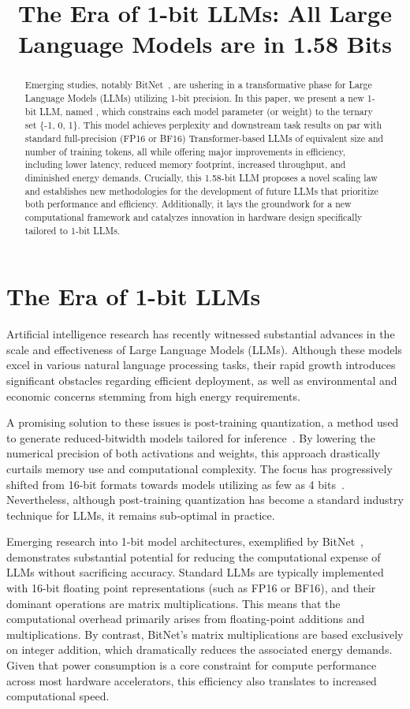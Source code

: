 \title{The Era of 1-bit LLMs: All Large Language Models are in 1.58 Bits}

\begin{abstract}
Emerging studies, notably BitNet~\cite{bitnet}, are ushering in a transformative phase for Large Language Models (LLMs) utilizing 1-bit precision. In this paper, we present a new 1-bit LLM, named \textbf{}, which constrains each model parameter (or weight) to the ternary set \{-1, 0, 1\}. This model achieves perplexity and downstream task results on par with standard full-precision (FP16 or BF16) Transformer-based LLMs of equivalent size and number of training tokens, all while offering major improvements in efficiency, including lower latency, reduced memory footprint, increased throughput, and diminished energy demands. Crucially, this 1.58-bit LLM proposes a novel scaling law and establishes new methodologies for the development of future LLMs that prioritize both performance and efficiency. Additionally, it lays the groundwork for a new computational framework and catalyzes innovation in hardware design specifically tailored to 1-bit LLMs.
\end{abstract}

\section{The Era of 1-bit LLMs}

Artificial intelligence research has recently witnessed substantial advances in the scale and effectiveness of Large Language Models (LLMs). Although these models excel in various natural language processing tasks, their rapid growth introduces significant obstacles regarding efficient deployment, as well as environmental and economic concerns stemming from high energy requirements.

A promising solution to these issues is post-training quantization, a method used to generate reduced-bitwidth models tailored for inference~\cite{smoothquant, gptq, quip, quip_sharp}. By lowering the numerical precision of both activations and weights, this approach drastically curtails memory use and computational complexity. The focus has progressively shifted from 16-bit formats towards models utilizing as few as 4 bits~\cite{gptq, awq}. Nevertheless, although post-training quantization has become a standard industry technique for LLMs, it remains sub-optimal in practice.

Emerging research into 1-bit model architectures, exemplified by BitNet~\cite{bitnet}, demonstrates substantial potential for reducing the computational expense of LLMs without sacrificing accuracy. Standard LLMs are typically implemented with 16-bit floating point representations (such as FP16 or BF16), and their dominant operations are matrix multiplications. This means that the computational overhead primarily arises from floating-point additions and multiplications. By contrast, BitNet’s matrix multiplications are based exclusively on integer addition, which dramatically reduces the associated energy demands. Given that power consumption is a core constraint for compute performance across most hardware accelerators, this efficiency also translates to increased computational speed.

